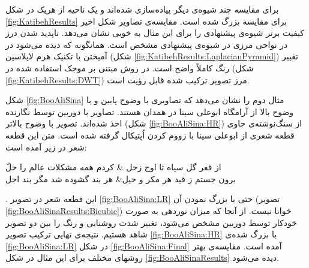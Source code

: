 \documentclass[11pt,a4paper,twocolumn]{article}
\numberwithin{table}{section}
\begin{document}
برای مقایسه‌ چند شیوه‌ی دیگر پیاده‌سازی شده‌اند و یک ناحیه از هریک در شکل \ref{fig:KatibehResults} برای مقایسه بزرگ شده است. مقایسه‌ی تصاویر شکل اخیر کیفیت برتر شیوه‌ی پیشنهادی را برای این مثال به خوبی نشان می‌دهد.  ناپدید شدن درز در نواحی مرزی در شیوه‌ی پیشنهادی مشخص است. همانگونه که دیده می‌شود در آمیختن با تکنیک هرم لاپلاسین (شکل \ref{fig:KatibehResults:LaplacianPyramid}) تغییر رنگ کاملاً واضح است. در روش مبتنی بر موجک استفاده شده در \cite{Amintoosi08reconstruction} (شکل \ref{fig:KatibehResults:DWT}) مرز تصویر ترکیب شده قابل رؤیت است. 

شکل‌ \ref{fig:BooAliSina} مثال دوم را نشان می‌دهد که تصاویری با وضوح پایین و با وضوح بالا از آرامگاه ابوعلی سینا در همدان هستند. تصاویر با دوربین  توسط نگارنده اخذ شده‌اند. تصویر با وضوح بالاتر (شکل \ref{fig:BooAliSina:HR}) از سنگ‌نوشته‌ی حاوی قطعه شعری از ابوعلی سینا با زووم کردن اُپتیکال گرفته شده است. متن این قطعه شعر در زیر آمده است:
{\nastaliq
\begin{traditionalpoem}
از قعر گل سیاه تا اوج زحل & 
کردم همه مشکلات عالم را حلّ\\
برون جستم ز قید هر مکر و حیل&
هر بند گشوده شد مگر بند اجل\\
\end{traditionalpoem}
}
. این قطعه شعر در تصویر \ref{fig:BooAliSina:LR} حتی با بزرگ نمودن آن (تصویر \ref{fig:BooAliSinaResults:Bicubic}) خوانا نیست. از آنجا که میزان نوردهی به صورت خودکار توسط دوربین مشخص می‌شود، تغییر شدت روشنایی و رنگ را بین دو تصویر شاهد هستیم. نتیجه‌ی نهایی ترکیب تصویر \ref{fig:BooAliSina:HR} با بزرگ شده‌ی \ref{fig:BooAliSina:LR}  در شکل \ref{fig:BooAliSina:Final} آمده است. مقایسه‌ی بهتر روشهای مختلف برای این مثال در شکل \ref{fig:BooAliSinaResults} دیده می‌شود.
\end{document}
